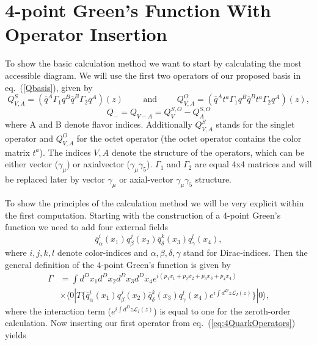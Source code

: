 \section{4-point Green's Function With Operator Insertion}
	To show the basic calculation method we want to start by calculating the most accessible diagram. We will use the first two operators of our proposed basis in eq.~(\ref{Qbasis}), given by 
	\begin{equation}
		\label{eq:4QuarkOperators}
		Q^S_{V,A} = \left ( \bar{q}^A \Gamma_1 q^B \bar q^B \Gamma_2 q^A \right )  (z) \qquad \text{ and } \qquad  Q^O_{V,A} = \left ( \bar{q}^A t^a \Gamma_1 q^B \bar q^B t^a \Gamma_2 q^A \right )  (z), 
	\end{equation}			
	\begin{equation}
		Q_- = Q_{V-A} = Q^{S,O}_{V} - Q^{S,O}_{A}
	\end{equation}
	where A and B denote flavor indices. Additionally $Q^S_{V,A}$ stands for the singlet operator and $Q^O_{V,A}$ for the octet operator (the octet operator contains the color matrix $t^a$). The indices $V,A$ denote the structure of the operators, which can be either vector ($\gamma_\mu$) or axialvector ($\gamma_\mu\gamma_5$). $\Gamma_1$ and $\Gamma_2$ are equal 4x4 matrices and will be replaced later by vector $\gamma_\mu$  or axial-vector $\gamma_\mu \gamma_5$ structure.  
\par 
To show the principles of the calculation method we will be very explicit within the first computation. Starting with the construction of a 4-point Green's function we need to add four external fields 
	\begin{equation}
		\bar q_\alpha^i (x_1) q_\beta^j (x_2) \bar q_\delta^k (x_3) q_\gamma^l (x_4),
	\end{equation}
	where $i,j,k,l$ denote color-indices and $\alpha, \beta, \delta, \gamma$ stand for Dirac-indices. Then the general definition of the 4-point Green's function is given by 
	\begin{equation}
		\label{eq:fourQuarkGreensFunction}
		\begin{split}
			\Gamma &= \int d^Dx_1d^Dx_2d^Dx_3d^Dx_4 e^{i(p_1x_1+p_2x_2+p_3x_3+p_4x_4)} \\	
			&\times \langle 0 | T  \{ \bar q_\alpha^i (x_1) q_\beta^j (x_2) \bar q_\delta^k (x_3) q_\gamma^l (x_4) e^{i\int d^Dz \mathcal{L}_I(z)} \}  | 0  \rangle, 
		\end{split}
	\end{equation}
	where the interaction term ($e^{i\int d^Dz \mathcal{L}_I(z)}$) is equal to one for the zeroth-order calculation. Now inserting our first operator from eq.~(\ref{eq:4QuarkOperators}) yields
